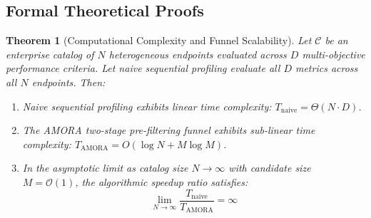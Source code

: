 \documentclass[conference,onecolumn,10pt]{IEEEtran}
\newtheorem{theorem}{Theorem}
\begin{document}
\subsection{Formal Theoretical Proofs}
\label{subsec:theoretical_proofs}

\begin{theorem}[Computational Complexity and Funnel Scalability]
\label{thm:complexity}
Let $\mathcal{C}$ be an enterprise catalog of $N$ heterogeneous endpoints evaluated across $D$ multi-objective performance criteria. Let naive sequential profiling evaluate all $D$ metrics across all $N$ endpoints. Then:
\begin{enumerate}
    \item Naive sequential profiling exhibits linear time complexity: $T_{\text{naive}} = \Theta(N \cdot D)$.
    \item The AMORA two-stage pre-filtering funnel exhibits sub-linear time complexity: $T_{\text{AMORA}} = O(\log N + M \log M)$.
    \item In the asymptotic limit as catalog size $N \to \infty$ with candidate size $M = \mathcal{O}(1)$, the algorithmic speedup ratio satisfies:
    \begin{equation}
        \lim_{N \to \infty} \frac{T_{\text{naive}}}{T_{\text{AMORA}}} = \infty
    \end{equation}
\end{enumerate}
\end{theorem}
\end{document}
